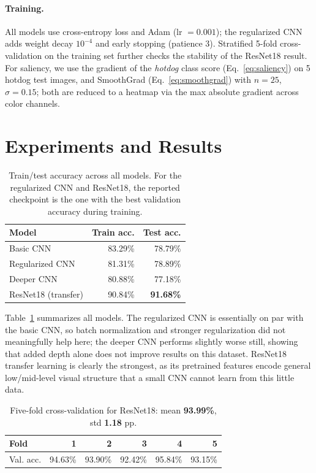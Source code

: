 \documentclass[10pt,twocolumn,letterpaper]{article}
\begin{document}
\paragraph{Training.} All models use cross-entropy loss and Adam (lr $=0.001$); the regularized CNN adds weight decay $10^{-4}$ and early stopping (patience 3). Stratified 5-fold cross-validation on the training set further checks the stability of the ResNet18 result. For saliency, we use the gradient of the \emph{hotdog} class score (Eq.~\ref{eq:saliency}) on 5 hotdog test images, and SmoothGrad (Eq.~\ref{eq:smoothgrad}) with $n{=}25$, $\sigma{=}0.15$; both are reduced to a heatmap via the max absolute gradient across color channels.

\section{Experiments and Results}
\label{sec:experiments}

\begin{table}[h]
\centering
\small
\begin{tabular}{lrr}
\toprule
Model & Train acc. & Test acc. \\
\midrule
Basic CNN & 83.29\% & 78.79\% \\
Regularized CNN & 81.31\% & 78.89\% \\
Deeper CNN & 80.88\% & 77.18\% \\
ResNet18 (transfer) & 90.84\% & \textbf{91.68\%} \\
\bottomrule
\end{tabular}
\caption{Train/test accuracy across all models. For the regularized CNN and ResNet18, the reported checkpoint is the one with the best validation accuracy during training.}
\label{tab:results}
\end{table}

Table~\ref{tab:results} summarizes all models. The regularized CNN is essentially on par with the basic CNN, so batch normalization and stronger regularization did not meaningfully help here; the deeper CNN performs slightly worse still, showing that added depth alone does not improve results on this dataset. ResNet18 transfer learning is clearly the strongest, as its pretrained features encode general low/mid-level visual structure that a small CNN cannot learn from this little data.

\begin{table}[h]
\centering
\footnotesize
\setlength{\tabcolsep}{3pt}
\begin{tabular}{lrrrrr}
\toprule
Fold & 1 & 2 & 3 & 4 & 5 \\
\midrule
Val. acc. & 94.63\% & 93.90\% & 92.42\% & 95.84\% & 93.15\% \\
\bottomrule
\end{tabular}
\caption{Five-fold cross-validation for ResNet18: mean \textbf{93.99\%}, std \textbf{1.18} pp.}
\label{tab:cv}
\end{table}
\end{document}

